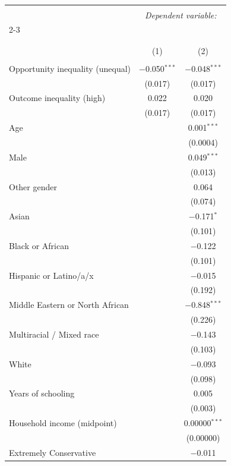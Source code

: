 
\begin{table}[H] \centering 
  \caption{} 
  \label{} 
\tiny 
\begin{tabular}{@{\extracolsep{5pt}}lcc} 
\\[-1.8ex]\hline 
\hline \\[-1.8ex] 
 & \multicolumn{2}{c}{\textit{Dependent variable:}} \\ 
\cline{2-3} 
\\[-1.8ex] & \multicolumn{2}{c}{} \\ 
\\[-1.8ex] & (1) & (2)\\ 
\hline \\[-1.8ex] 
 Opportunity inequality (unequal) & $-$0.050$^{***}$ & $-$0.048$^{***}$ \\ 
  & (0.017) & (0.017) \\ 
  Outcome inequality (high) & 0.022 & 0.020 \\ 
  & (0.017) & (0.017) \\ 
  Age &  & 0.001$^{***}$ \\ 
  &  & (0.0004) \\ 
  Male &  & 0.049$^{***}$ \\ 
  &  & (0.013) \\ 
  Other gender &  & 0.064 \\ 
  &  & (0.074) \\ 
  Asian &  & $-$0.171$^{*}$ \\ 
  &  & (0.101) \\ 
  Black or African &  & $-$0.122 \\ 
  &  & (0.101) \\ 
  Hispanic or Latino/a/x &  & $-$0.015 \\ 
  &  & (0.192) \\ 
  Middle Eastern or North African &  & $-$0.848$^{***}$ \\ 
  &  & (0.226) \\ 
  Multiracial / Mixed race &  & $-$0.143 \\ 
  &  & (0.103) \\ 
  White &  & $-$0.093 \\ 
  &  & (0.098) \\ 
  Years of schooling &  & 0.005 \\ 
  &  & (0.003) \\ 
  Household income (midpoint) &  & 0.00000$^{***}$ \\ 
  &  & (0.00000) \\ 
  Extremely Conservative &  & $-$0.011 \\ 

\end{tabular}
\end{table}
